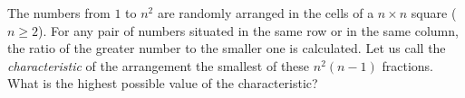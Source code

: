 The numbers from $1$ to $n^2$ are randomly arranged in the cells of a $n \times n$ square ($n \geq 2$). For any pair of numbers situated in the same row or in the same column, the ratio of the greater number to the smaller one is calculated. Let us call the \emph{characteristic} of the arrangement the smallest of these $n^2(n-1)$ fractions. What is the highest possible value of the characteristic?
